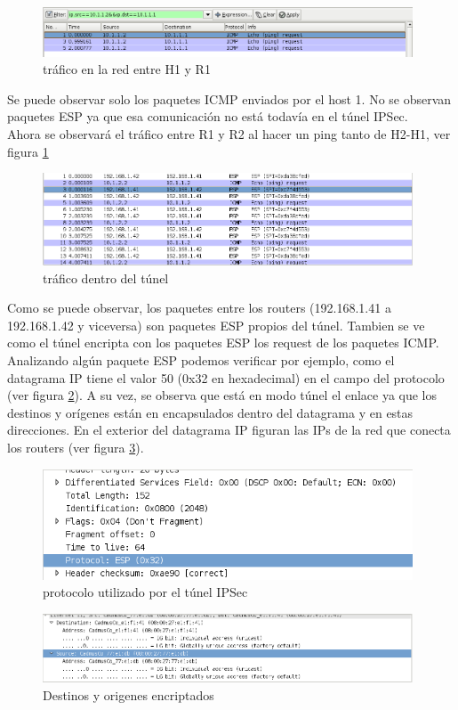 \documentclass[a4paper,10pt]{article}
\begin{document}
	\begin{figure}[H]
		\centering
		\includegraphics[width=11cm]{Imagenes/pingH1R1.png}
		\caption{tráfico en la red entre H1 y R1}
	\end{figure}	

	
	\indent Se puede observar solo los paquetes ICMP enviados por el host 1. No se observan paquetes ESP ya que esa comunicación no está todavía en el túnel IPSec. \\
	\indent Ahora se observará el tráfico entre R1 y R2 al hacer un ping tanto de H2-H1, ver figura \ref{img025}

	\begin{figure}[H]
		\centering
		\includegraphics[width=11cm]{Imagenes/paquetesESP.png}
		\caption{tr\'afico dentro del t\'unel}\label{img025}
	\end{figure}	
	
	\indent Como se puede observar, los paquetes entre los routers (192.168.1.41 a 192.168.1.42 y viceversa) son paquetes ESP propios del túnel. Tambien se ve como el túnel encripta con los paquetes ESP los request de los paquetes ICMP. \\
	\indent Analizando algún paquete ESP podemos verificar por ejemplo, como el datagrama IP tiene el valor 50 (0x32 en hexadecimal) en el campo del protocolo (ver figura \ref{img026}). A su vez, se observa que está en modo túnel el enlace ya que los destinos y orígenes están en encapsulados dentro del datagrama y en estas direcciones. En el exterior del datagrama IP figuran las IPs de la red que conecta los routers (ver figura \ref{img027}).
	
	\begin{figure}[H]
		\centering
		\includegraphics[width=11cm]{Imagenes/protocoloESP.png}
		\caption{protocolo utilizado por el túnel IPSec}\label{img026}
	\end{figure}	
	\begin{figure}[H]
		\centering
		\includegraphics[width=11cm]{Imagenes/DestOrigenEncriptados.png}
		\caption{Destinos y origenes encriptados}\label{img027}
	\end{figure}	
	
\end{document}
